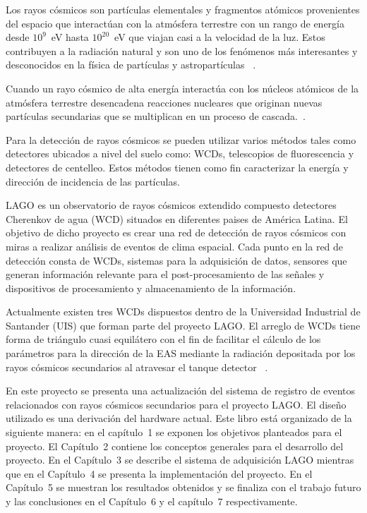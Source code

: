 
Los rayos cósmicos son partículas elementales y fragmentos atómicos provenientes del espacio que interactúan con la atmósfera terrestre con un rango de energía desde $10^9$~eV hasta $10^{20}$~eV que viajan casi a la velocidad de la luz. Estos contribuyen a la radiación natural y son uno de los fenómenos más interesantes y desconocidos en la física de partículas y astropartículas ~\citep{Supanitsky2007}.

Cuando un rayo cósmico de alta energía interactúa con los núcleos atómicos de la  atmósfera terrestre desencadena reacciones nucleares que originan nuevas partículas secundarias que se multiplican en un proceso de cascada.~\citep{phdthesis}.

Para la detección de rayos cósmicos se pueden utilizar varios métodos tales como detectores ubicados a nivel del suelo como: WCDs, telescopios de fluorescencia y detectores de centelleo.
Estos métodos tienen como fin caracterizar la energía y dirección de incidencia de las partículas.

LAGO es un observatorio de rayos cósmicos extendido  compuesto detectores Cherenkov de agua (WCD) situados en diferentes paises de América Latina.
El objetivo de dicho proyecto es crear una red de detección de rayos cósmicos con miras a realizar análisis de eventos de clima espacial.
Cada punto en la red de detección consta de WCDs, sistemas para la adquisición de datos, sensores que generan información relevante para el post-procesamiento de las señales y dispositivos de procesamiento y almacenamiento de la información.

Actualmente existen tres WCDs dispuestos dentro de la Universidad Industrial de Santander (UIS) que forman parte del proyecto LAGO.
El arreglo de WCDs tiene forma de triángulo cuasi equilátero con el fin de facilitar el cálculo de los parámetros para la dirección de la EAS mediante la radiación depositada por los rayos cósmicos secundarios al atravesar el tanque detector ~\citep{hernandez2018procedimiento}.

En este  proyecto se  presenta  una  actualización del sistema de registro de eventos  relacionados con rayos cósmicos secundarios para el proyecto LAGO.
El diseño utilizado es una derivación del hardware actual.
Este libro está organizado de la siguiente manera: 
en el capítulo~1 se exponen los objetivos planteados para el proyecto.
El Capítulo~2 contiene los conceptos generales para el desarrollo del proyecto.
En el Capítulo~3 se describe el sistema de adquisición LAGO mientras que en el Capítulo~4 se presenta la implementación del proyecto.
En el Capítulo~5 se muestran los resultados obtenidos y se finaliza con el trabajo futuro y las conclusiones en el Capítulo~6 y el capítulo~7 respectivamente.
 
